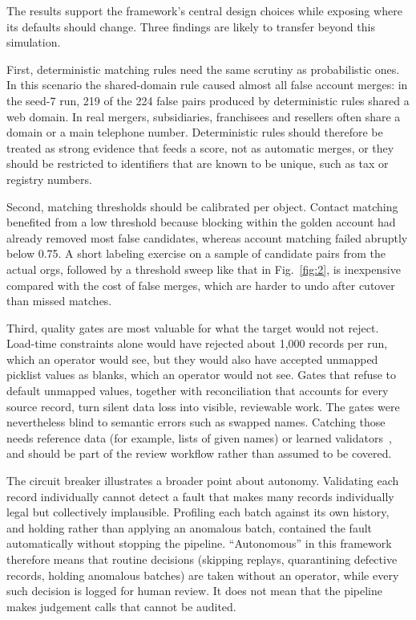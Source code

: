 The results support the framework's central design choices while exposing where its defaults should change. Three findings are likely to transfer beyond this simulation.

First, deterministic matching rules need the same scrutiny as probabilistic ones. In this scenario the shared-domain rule caused almost all false account merges: in the seed-7 run, 219 of the 224 false pairs produced by deterministic rules shared a web domain. In real mergers, subsidiaries, franchisees and resellers often share a domain or a main telephone number. Deterministic rules should therefore be treated as strong evidence that feeds a score, not as automatic merges, or they should be restricted to identifiers that are known to be unique, such as tax or registry numbers.

Second, matching thresholds should be calibrated per object. Contact matching benefited from a low threshold because blocking within the golden account had already removed most false candidates, whereas account matching failed abruptly below 0.75. A short labeling exercise on a sample of candidate pairs from the actual orgs, followed by a threshold sweep like that in Fig.~\ref{fig:2}, is inexpensive compared with the cost of false merges, which are harder to undo after cutover than missed matches.

Third, quality gates are most valuable for what the target would not reject. Load-time constraints alone would have rejected about 1,000 records per run, which an operator would see, but they would also have accepted unmapped picklist values as blanks, which an operator would not see. Gates that refuse to default unmapped values, together with reconciliation that accounts for every source record, turn silent data loss into visible, reviewable work. The gates were nevertheless blind to semantic errors such as swapped names. Catching those needs reference data (for example, lists of given names) or learned validators~\cite{breck2019}, and should be part of the review workflow rather than assumed to be covered.

The circuit breaker illustrates a broader point about autonomy. Validating each record individually cannot detect a fault that makes many records individually legal but collectively implausible. Profiling each batch against its own history, and holding rather than applying an anomalous batch, contained the fault automatically without stopping the pipeline. ``Autonomous'' in this framework therefore means that routine decisions (skipping replays, quarantining defective records, holding anomalous batches) are taken without an operator, while every such decision is logged for human review. It does not mean that the pipeline makes judgement calls that cannot be audited.

